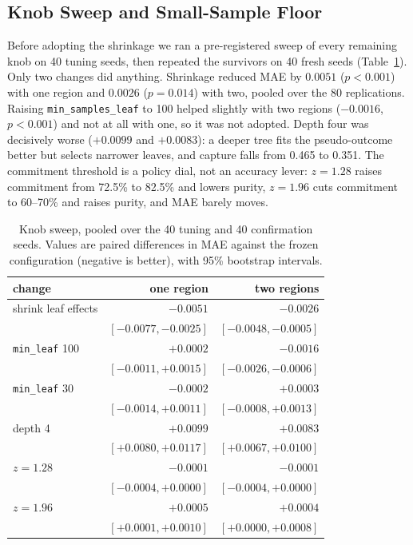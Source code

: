 \documentclass[conference]{IEEEtran}
\begin{document}
\subsection{Knob Sweep and Small-Sample Floor}

Before adopting the shrinkage we ran a pre-registered sweep of every remaining
knob on 40 tuning seeds, then repeated the survivors on 40 fresh seeds
(Table~\ref{tab:sweep}). Only two changes did anything. Shrinkage reduced MAE by
$0.0051$ ($p<0.001$) with one region and $0.0026$ ($p=0.014$) with two, pooled
over the 80 replications. Raising \texttt{min\_samples\_leaf} to 100 helped
slightly with two regions ($-0.0016$, $p<0.001$) and not at all with one, so it
was not adopted. Depth four was decisively worse ($+0.0099$ and $+0.0083$):
a deeper tree fits the pseudo-outcome better but selects narrower leaves, and
capture falls from 0.465 to 0.351. The commitment threshold is a policy dial,
not an accuracy lever: $z=1.28$ raises commitment from 72.5\% to 82.5\% and
lowers purity, $z=1.96$ cuts commitment to 60--70\% and raises purity, and MAE
barely moves.

\begin{table}[t]
\caption{Knob sweep, pooled over the 40 tuning and 40 confirmation seeds. Values
are paired differences in MAE against the frozen configuration (negative is
better), with 95\% bootstrap intervals.}
\label{tab:sweep}
\centering
\footnotesize
\setlength{\tabcolsep}{3pt}
\begin{tabular}{@{}lrr@{}}
\toprule
change & one region & two regions\\
\midrule
shrink leaf effects & $\mathbf{-0.0051}$ & $\mathbf{-0.0026}$\\
  & $[-0.0077,-0.0025]$ & $[-0.0048,-0.0005]$\\
\texttt{min\_leaf} 100 & $+0.0002$ & $\mathbf{-0.0016}$\\
  & $[-0.0011,+0.0015]$ & $[-0.0026,-0.0006]$\\
\texttt{min\_leaf} 30 & $-0.0002$ & $+0.0003$\\
  & $[-0.0014,+0.0011]$ & $[-0.0008,+0.0013]$\\
depth 4 & $+0.0099$ & $+0.0083$\\
  & $[+0.0080,+0.0117]$ & $[+0.0067,+0.0100]$\\
$z=1.28$ & $-0.0001$ & $-0.0001$\\
  & $[-0.0004,+0.0000]$ & $[-0.0004,+0.0000]$\\
$z=1.96$ & $+0.0005$ & $+0.0004$\\
  & $[+0.0001,+0.0010]$ & $[+0.0000,+0.0008]$\\
\bottomrule
\end{tabular}
\end{table}
\end{document}
